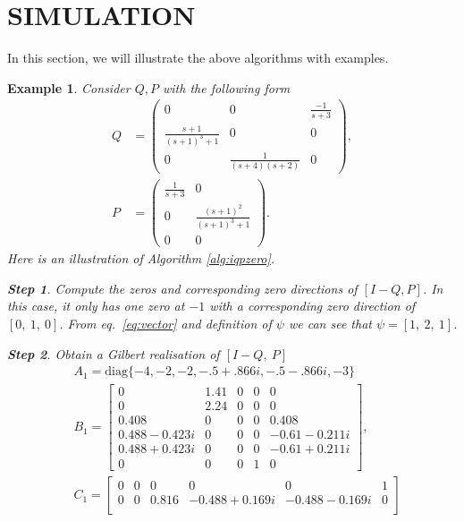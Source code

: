 \documentclass[twocolumn,12pt]{autart}
\theoremstyle{plain}
\newtheorem{example}{Example}
\newtheorem{Steps}{Step}
\begin{document}
\section{SIMULATION}
In this section, we will illustrate the above algorithms with examples.
\begin{example}
Consider $Q, P$ with the following form
\begin{align}
Q &= \begin{pmatrix} 0 & 0 & \frac{-1}{s+3} \\ \frac{s+1}{(s+1)^3+1} & 0 & 0 \\ 0 & \frac{1}{(s+4)(s+2)} & 0 \end{pmatrix},\\
P &= \begin{pmatrix} \frac{1}{s+3} & 0 \\ 0 & \frac{(s+1)^2}{(s+1)^3+1} \\ 0 & 0 \end{pmatrix}.
\end{align}
Here is an illustration of Algorithm \ref{alg:iqpzero}.
\begin{Steps}
Compute the zeros and corresponding zero directions of $[I-Q,P]$. In this case, it only has one zero at $-1$ with a corresponding zero direction of $[0,~1,~0]$. From eq.~\eqref{eq:vector} and definition of $\psi$ we can see that $\psi =[1,~2,~1]$.
\end{Steps}
\begin{Steps}
Obtain a Gilbert realisation of $[I-Q,~ P]$ 
\begin{align*}
&A_1 = \text{diag}\{-4,-2,-2,-.5+.866i,-.5-.866i,-3\}\\
&B_1 = \begin{bmatrix}
             0          & 1.41 & 0 & 0 & 0 \\
        0          &   2.24 & 0 &  0  & 0 \\
 0.408 & 0 & 0 & 0 & 0.408\\
    0.488-0.423i        &         0       &          0  &      0&      -0.61-0.211i\\
        0.488+0.423i        &         0       &          0  &      0&      -0.61+0.211i\\
0 & 0 & 0 & 1 & 0
 \end{bmatrix},\\
 &C_1 = \begin{bmatrix}
    0 &   0   &        0                 &  0 & 0 & 1\\          
        0    &                0     &               0 .816 & -0.488+0.169i &     -0.488-0.169i       &          0\\

\end{bmatrix}
\end{align*}
\end{Steps}
\end{example}
\end{document}
